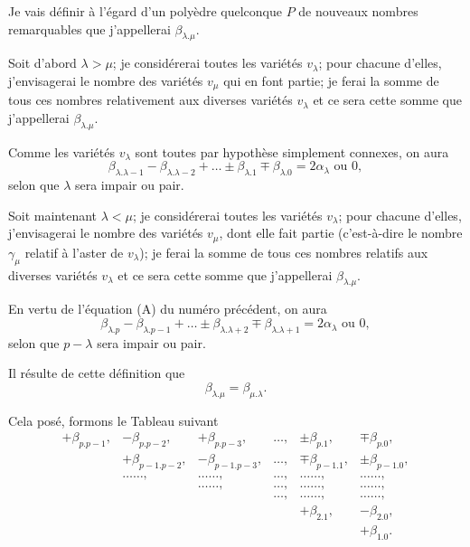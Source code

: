 \documentclass{article}
\begin{document}
Je vais définir à l'égard d'un polyèdre quelconque $P$ de nouveaux nombres remarquables que j'appellerai $\beta_{\lambda.\mu}$.

Soit d'abord $\lambda > \mu$; je considérerai toutes les variétés $v_{\lambda}$; pour chacune d'elles, j'envisagerai le nombre des variétés $v_{\mu}$ qui en font partie; je ferai la somme de tous ces nombres relativement aux diverses variétés $v_{\lambda}$ et ce sera cette somme que j'appellerai $\beta_{\lambda.\mu}$.

Comme les variétés $v_{\lambda}$ sont toutes par hypothèse simplement connexes, on aura
\[ \beta_{\lambda.\lambda-1} - \beta_{\lambda.\lambda-2} + \ldots \pm \beta_{\lambda.1} \mp \beta_{\lambda.0} = 2\alpha_{\lambda} \text{ ou } 0, \]
selon que $\lambda$ sera impair ou pair.

Soit maintenant $\lambda < \mu$; je considérerai toutes les variétés $v_{\lambda}$; pour chacune d'elles, j'envisagerai le nombre des variétés $v_{\mu}$, dont elle fait partie (c'est-à-dire le nombre $\gamma_{\mu}$ relatif à l'aster de $v_{\lambda}$); je ferai la somme de tous ces nombres relatifs aux diverses variétés $v_{\lambda}$ et ce sera cette somme que j'appellerai $\beta_{\lambda.\mu}$.

En vertu de l'équation (A) du numéro précédent, on aura
\[ \beta_{\lambda.p} - \beta_{\lambda.p-1} + \ldots \pm \beta_{\lambda.\lambda+2} \mp \beta_{\lambda.\lambda+1} = 2\alpha_{\lambda} \text{ ou } 0, \]
selon que $p - \lambda$ sera impair ou pair.

Il résulte de cette définition que
\[ \beta_{\lambda.\mu} = \beta_{\mu.\lambda}. \]

Cela posé, formons le Tableau suivant
\[ \begin{matrix} +\beta_{p.p-1}, & -\beta_{p.p-2}, & +\beta_{p.p-3}, & \ldots, & \pm\beta_{p.1}, & \mp\beta_{p.0}, \\[1ex] & +\beta_{p-1.p-2}, & -\beta_{p-1.p-3}, & \ldots, & \mp\beta_{p-1.1}, & \pm\beta_{p-1.0}, \\[1ex] & \ldots\ldots, & \ldots\ldots, & \ldots, & \ldots\ldots, & \ldots\ldots, \\[1ex] & & \ldots\ldots, & \ldots, & \ldots\ldots, & \ldots\ldots, \\[1ex] & & & \ldots, & \ldots\ldots, & \ldots\ldots, \\[1ex] & & & & +\beta_{2.1}, & -\beta_{2.0}, \\[1ex] & & & & & +\beta_{1.0}. \end{matrix} \]
\end{document}
